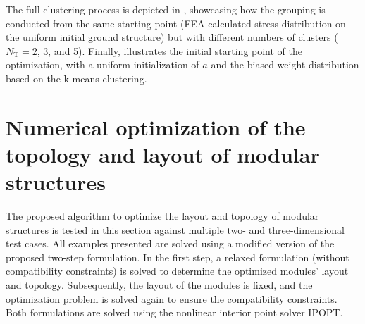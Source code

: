 The full clustering process is depicted in , showcasing how the grouping is conducted from the same starting point (FEA-calculated stress distribution on the uniform initial ground structure) but with different numbers of clusters ($N_\text{T}=2$, 3, and 5). Finally,  illustrates the initial starting point of the optimization, with a uniform initialization of $\bar{a}$ and the biased weight distribution based on the k-means clustering.

\section{Numerical optimization of the topology and layout of modular structures}\label{sec:06_num_app}
The proposed algorithm to optimize the layout and topology of modular structures is tested in this section against multiple two- and three-dimensional test cases. All examples presented are solved using a modified version of the proposed two-step formulation. In the first step, a relaxed formulation (without compatibility constraints) is solved to determine the optimized modules' layout and topology. Subsequently, the layout of the modules is fixed, and the optimization problem is solved again to ensure the compatibility constraints. Both formulations are solved using the nonlinear interior point solver IPOPT.

